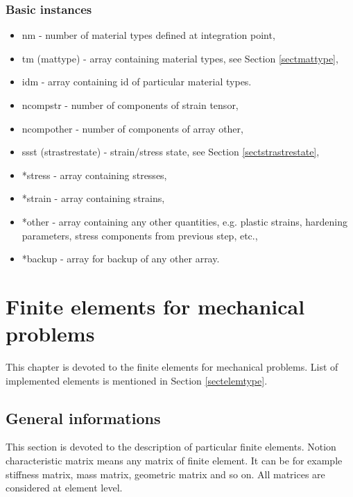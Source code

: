 \subsection{Basic instances}
\begin{itemize}
\item{nm - number of material types defined at integration point,}
\item{tm (mattype) - array containing material types, see Section \ref{sectmattype},}
\item{idm - array containing id of particular material types.}
\item{ncompstr - number of components of strain tensor,}
\item{ncompother - number of components of array other,}
\item{ssst (strastrestate) - strain/stress state, see Section \ref{sectstrastrestate},}
\item{*stress - array containing stresses,}
\item{*strain - array containing strains,}
\item{*other - array containing any other quantities, e.g. plastic strains, hardening parameters, stress
components from previous step, etc.,}
\item{*backup - array for backup of any other array.}
\end{itemize}



\chapter{Finite elements for mechanical problems}

This chapter is devoted to the finite elements for mechanical problems. List
of implemented elements is mentioned in Section \ref{sectelemtype}.

\section{General informations}
\label{sectgeninform}

This section is devoted to the description of particular finite elements. Notion characteristic
matrix  means any matrix of finite element. It can be for example stiffness matrix,
mass matrix, geometric matrix and so on. All matrices are considered at element level.

